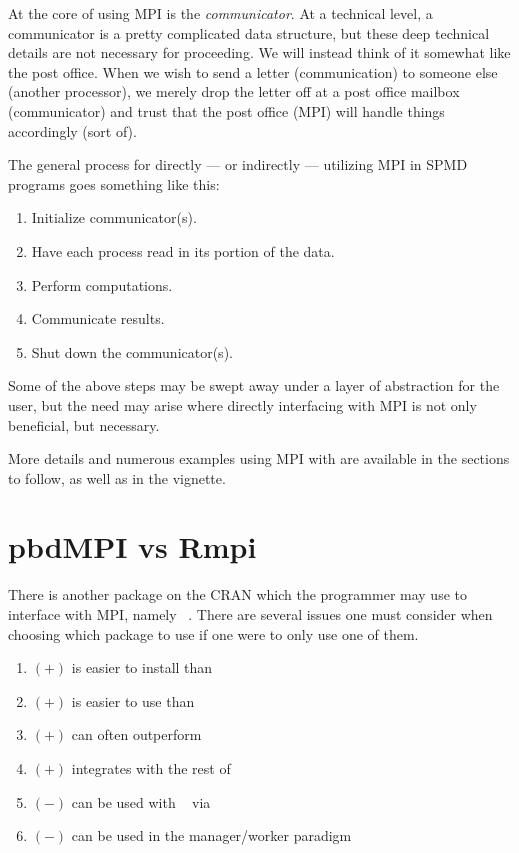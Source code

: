 At the core of using MPI is the \emph{communicator}. At a technical level,
a communicator is a pretty complicated data structure, but these deep
technical details are not necessary for proceeding. We will instead think
of it somewhat like the post office. When we wish to send a letter
(communication) to someone else (another processor), we merely drop
the letter off at a post office mailbox (communicator) and trust that
the post office (MPI) will handle things accordingly (sort of).

The general process for directly --- or indirectly --- utilizing MPI in
SPMD programs goes something like this:

\begin{enumerate}
 \item Initialize communicator(s).
 \item Have each process read in its portion of the data.
 \item Perform computations.
 \item Communicate results.
 \item Shut down the communicator(s).
\end{enumerate}

Some of the above steps may be swept away under a layer of abstraction for
the user, but the need may arise where directly interfacing with MPI is not
only beneficial, but necessary.

More details and numerous examples using MPI with  are
available in the sections to follow, as well as in the 
vignette.





\section{pbdMPI vs Rmpi}

There is another package on the CRAN which the  programmer may
use to interface with MPI, namely
~\citep{Rmpi}. There are several issues
one must consider when choosing which package to use if one were to only
use one of them.
\begin{enumerate}
 \item $(+)$  is easier to install than 
 \item $(+)$  is easier to use than 
 \item\label{enum:perf} $(+)$  can often outperform 
 \item\label{enum:integrate} $(+)$  integrates with the rest of
 \item\label{enum:dompi} $(-)$  can be used with
      ~\citep{foreach} via
      ~\citep{dompi}
 \item $(-)$  can be used in the manager/worker paradigm
\end{enumerate}

